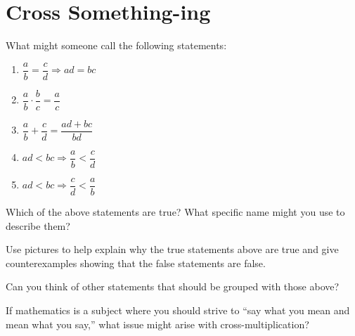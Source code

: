 \newpage
\section{Cross Something-ing}


\begin{prob} 
What might someone call the following statements:
\begin{enumerate}
\item $\dfrac{a}{b} = \dfrac{c}{d} \Rightarrow ad = bc$
\item $\dfrac{a}{b}\cdot \dfrac{b}{c} = \dfrac{a}{c}$
\item $\dfrac{a}{b} +\dfrac{c}{d} = \dfrac{ad+bc}{bd}$
\item $ad < bc \Rightarrow \dfrac{a}{b} < \dfrac{c}{d}$
\item $ad < bc \Rightarrow \dfrac{c}{d} < \dfrac{a}{b}$
\end{enumerate}
\end{prob}

\begin{prob}
Which of the above statements are true? What specific name might you
use to describe them?
\end{prob}

\begin{prob} 
Use pictures to help explain why the true statements above are true
and give counterexamples showing that the false statements are false.
\end{prob}


\begin{prob} 
Can you think of other statements that should be grouped with those
above?
\end{prob}

\begin{prob}
If mathematics is a subject where you should strive to ``say what you
mean and mean what you say,'' what issue might arise with
cross-multiplication?
\end{prob}

